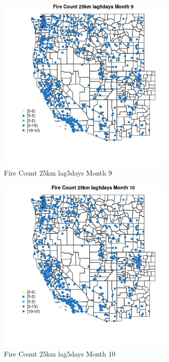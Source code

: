 \begin{figure} 
\centering  
\includegraphics[width=0.77\textwidth]{Code_Outputs/Report_ML_input_PM25_Step4_part_e_de_duplicated_aves_compiled_2019-05-21wNAs_MapObsMo9Fire_Count_25km_lag5days.jpg} 
\caption{\label{fig:Report_ML_input_PM25_Step4_part_e_de_duplicated_aves_compiled_2019-05-21wNAsMapObsMo9Fire_Count_25km_lag5days}Fire Count 25km lag5days Month 9} 
\end{figure} 
 

\begin{figure} 
\centering  
\includegraphics[width=0.77\textwidth]{Code_Outputs/Report_ML_input_PM25_Step4_part_e_de_duplicated_aves_compiled_2019-05-21wNAs_MapObsMo10Fire_Count_25km_lag5days.jpg} 
\caption{\label{fig:Report_ML_input_PM25_Step4_part_e_de_duplicated_aves_compiled_2019-05-21wNAsMapObsMo10Fire_Count_25km_lag5days}Fire Count 25km lag5days Month 10} 
\end{figure} 
 

